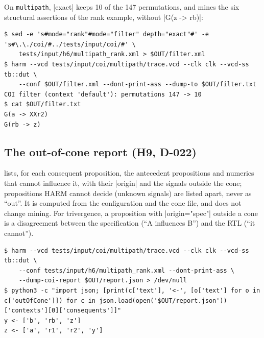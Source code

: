 On \texttt{multipath}, \code|exact| keeps 10 of the 147 permutations, and mines the six structural assertions of the rank example, without \code|G(z -> rb)|:

\begin{lstlisting}
$ sed -e 's#mode="rank"#mode="filter" depth="exact"#' -e 's#\.\./coi/#../tests/input/coi/#' \
    tests/input/h6/multipath_rank.xml > $OUT/filter.xml
$ harm --vcd tests/input/coi/multipath/trace.vcd --clk clk --vcd-ss tb::dut \
    --conf $OUT/filter.xml --dont-print-ass --dump-to $OUT/filter.txt
COI filter (context 'default'): permutations 147 -> 10
$ cat $OUT/filter.txt
G(a -> XXr2)
G(rb -> z)
\end{lstlisting}

\subsection{The out-of-cone report (H9, D-022)}
 lists, for each consequent proposition, the antecedent propositions and numerics that cannot influence it, with their \code|origin| and the signals outside the cone; propositions HARM cannot decide (unknown signals) are listed apart, never as ``out''. It is computed from the configuration and the cone file, and does not change mining. For trivergence, a proposition with \code|origin="spec"| outside a cone is a disagreement between the specification (``A influences B'') and the RTL (``it cannot'').

\begin{lstlisting}
$ harm --vcd tests/input/coi/multipath/trace.vcd --clk clk --vcd-ss tb::dut \
    --conf tests/input/h6/multipath_rank.xml --dont-print-ass \
    --dump-coi-report $OUT/report.json > /dev/null
$ python3 -c "import json; [print(c['text'], '<-', [o['text'] for o in c['outOfCone']]) for c in json.load(open('$OUT/report.json'))['contexts'][0]['consequents']]"
y <- ['b', 'rb', 'z']
z <- ['a', 'r1', 'r2', 'y']
\end{lstlisting}

